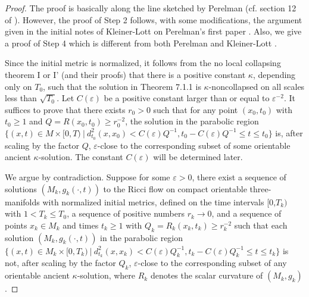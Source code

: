 \begin{proof} The proof is basically along the line sketched by Perelman
(cf. section 12 of \cite{P1}). However, the proof of Step 2
follows, with some modifications, the argument given in the
initial notes of Kleiner-Lott \cite{KL} on Perelman's first paper
\cite{P1}. Also, we give a proof of Step 4 which is different from
both Perelman \cite{P1} and Kleiner-Lott \cite{KL}.

Since the initial metric is normalized, it follows from the no
local collapsing theorem I or I' (and their proofs) that there is
a positive constant $\kappa$, depending only on $T_0$, such that
the solution in Theorem 7.1.1 is $\kappa$-noncollapsed on all
scales less than $\sqrt{T_0}$. Let $C(\varepsilon)$ be a positive
constant larger than or equal to $\varepsilon^{-2}$. It suffices
to prove that there exists $r_0
>0$ such that for any point $(x_0,t_0)$ with $t_0 \geq 1$ and
$Q=R(x_0,t_0) \geq r_0^{-2}$, the solution in the parabolic region
$\{ (x,t) \in M \times [0,T)\ | \ d^2_{t_0}(x,x_0)<
C(\varepsilon)Q^{-1}, t_0-C(\varepsilon)Q^{-1}\leq t \leq t_0\}$
is, after scaling by the factor $Q$, $\varepsilon$-close to the
corresponding subset of some orientable ancient $\kappa$-solution.
The constant $C(\varepsilon)$ will be determined later.

We argue by contradiction. Suppose for some $\varepsilon>0$, there
exist a sequence of solutions $(M_k,g_k(\cdot,t))$ to the Ricci
flow on compact orientable three-manifolds with normalized initial
metrics, defined on the time intervals [0,$T_k)$ with $1<T_k \leq
T_0$, a sequence of positive numbers $r_k\rightarrow 0$, and a
sequence of points $x_k\in M_k$ and times $t_k\geq 1$ with
$Q_k=R_k(x_k,t_k)\geq r_k^{-2}$ such that each solution
$(M_k,g_k(\cdot,t))$ in the parabolic region $\{(x,t) \in
M_k\times [0,T_k)\ |\ d^2_{t_k}(x,x_k)<C(\varepsilon)Q_k^{-1},
t_k-C(\varepsilon)Q_k^{-1}\leq t\leq t_k\}$ is not, after scaling
by the factor $Q_k$, $\varepsilon$-close to the corresponding
subset of any orientable ancient $\kappa$-solution, where $R_k$
denotes the scalar curvature of $(M_k,g_k)$.


\end{proof}
